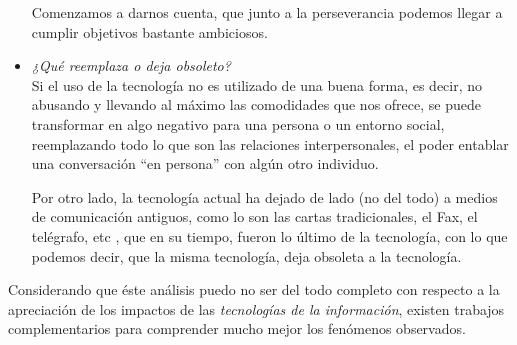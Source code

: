 \begin{itemize}
		Comenzamos a darnos cuenta, que junto a la perseverancia podemos llegar a cumplir objetivos bastante ambiciosos.		

	\item \emph{¿Qué reemplaza o deja obsoleto?}\\
		Si el uso de la tecnología no es utilizado de una buena forma, es decir, no abusando y llevando al máximo las comodidades que nos ofrece,
		se puede transformar en algo negativo para una persona o un entorno social, reemplazando todo lo que son las relaciones interpersonales,
		el poder entablar una conversación ``en persona'' con algún otro individuo.

		Por otro lado, la tecnología actual ha dejado de lado (no del todo) a medios de comunicación antiguos, como lo son las cartas tradicionales,
		el Fax, el telégrafo, etc , que en su tiempo, fueron lo último de la tecnología, con lo que podemos decir, que la misma tecnología,
		deja obsoleta a la tecnología.

\end{itemize}

Considerando que éste análisis puedo no ser del todo completo con respecto a la apreciación de los impactos de las \emph{tecnologías de la información},
existen trabajos complementarios para comprender mucho mejor los fenómenos observados.

